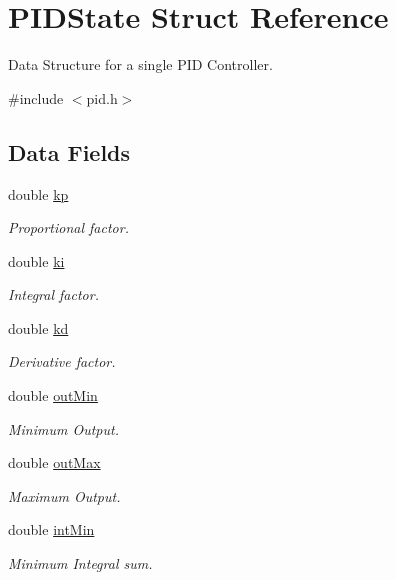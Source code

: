 \hypertarget{struct_p_i_d_state}{\section{P\-I\-D\-State Struct Reference}
\label{struct_p_i_d_state}
}


Data Structure for a single P\-I\-D Controller.  




{\ttfamily \#include $<$pid.\-h$>$}

\subsection*{Data Fields}
\begin{DoxyCompactItemize}
\item 
double \hyperlink{struct_p_i_d_state_ac6390bc2d074992cc6ca37d132a5262d}{kp}
\begin{DoxyCompactList}\small\item\em Proportional factor. \end{DoxyCompactList}\item 
double \hyperlink{struct_p_i_d_state_a23e09706a4abb026e1de279c4904e926}{ki}
\begin{DoxyCompactList}\small\item\em Integral factor. \end{DoxyCompactList}\item 
double \hyperlink{struct_p_i_d_state_a1cf17dd45e85748457863776dcb28335}{kd}
\begin{DoxyCompactList}\small\item\em Derivative factor. \end{DoxyCompactList}\item 
double \hyperlink{struct_p_i_d_state_a5df6ddfa37685d9035861b0d9f323a05}{out\-Min}
\begin{DoxyCompactList}\small\item\em Minimum Output. \end{DoxyCompactList}\item 
double \hyperlink{struct_p_i_d_state_a3bcf8ed648b49bfe14cf141b134ba23b}{out\-Max}
\begin{DoxyCompactList}\small\item\em Maximum Output. \end{DoxyCompactList}\item 
double \hyperlink{struct_p_i_d_state_a76c3abc852d5003bd3a2b1cdaa09b80c}{int\-Min}
\begin{DoxyCompactList}\small\item\em Minimum Integral sum. \end{DoxyCompactList}\item 

\end{DoxyCompactItemize}
